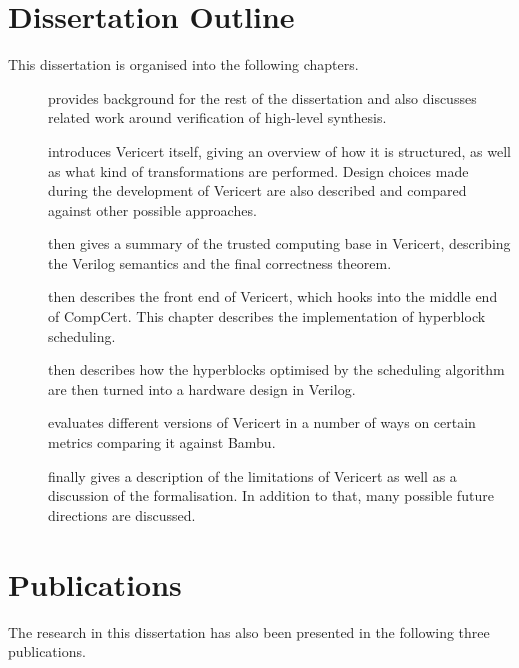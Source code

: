 \section{Dissertation Outline}

This dissertation is organised into the following chapters.

\begin{description}
\item[] provides background for the rest of the
  dissertation and also discusses related work around verification of high-level
  synthesis.
\item[] introduces Vericert itself, giving an
  overview of how it is structured, as well as what kind of transformations are
  performed.  Design choices made during the development of Vericert are also
  described and compared against other possible approaches.
\item[] then gives a summary of the trusted
  computing base in Vericert, describing the Verilog semantics and the final
  correctness theorem.
\item[] then describes the front end of
  Vericert, which hooks into the middle end of \gls{CompCert}.  This chapter
  describes the implementation of hyperblock scheduling.
\item[] then describes how the hyperblocks
  optimised by the scheduling algorithm are then turned into a hardware design
  in Verilog.
\item[] evaluates different versions of Vericert in a
  number of ways on certain metrics comparing it against Bambu.
\item[] finally gives a description of the limitations of
  Vericert as well as a discussion of the formalisation.  In addition to that,
  many possible future directions are discussed.
\end{description}

\section{Publications}

The research in this dissertation has also been presented in the following three
publications.

